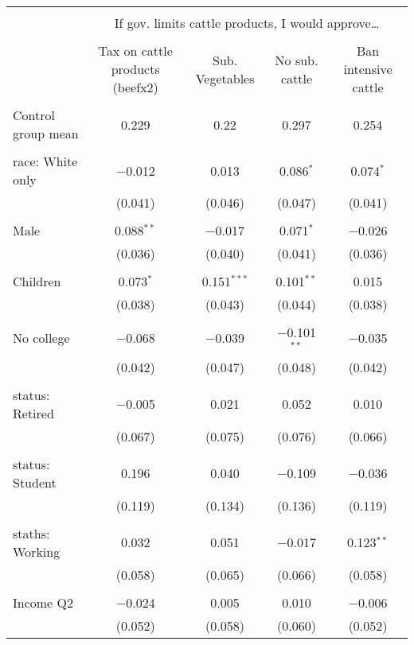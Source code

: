 
\begin{tabular}{@{\extracolsep{5pt}}lcccc} 
\\[-1.8ex]\hline 
\hline \\[-1.8ex] 
 & \multicolumn{4}{c}{If gov. limits cattle products, I would approve…} \\ 
\cline{2-5} 
\\[-1.8ex] & Tax on cattle products (beefx2) & Sub. Vegetables & No sub. cattle & Ban intensive cattle \\ 
\hline \\[-1.8ex] 
 Control group mean & 0.229 & 0.22 & 0.297 & 0.254  \\ \hline \\[-1.8ex] race: White only & $-$0.012 & 0.013 & 0.086$^{*}$ & 0.074$^{*}$ \\ 
  & (0.041) & (0.046) & (0.047) & (0.041) \\ 
  & & & & \\ 
 Male & 0.088$^{**}$ & $-$0.017 & 0.071$^{*}$ & $-$0.026 \\ 
  & (0.036) & (0.040) & (0.041) & (0.036) \\ 
  & & & & \\ 
 Children & 0.073$^{*}$ & 0.151$^{***}$ & 0.101$^{**}$ & 0.015 \\ 
  & (0.038) & (0.043) & (0.044) & (0.038) \\ 
  & & & & \\ 
 No college & $-$0.068 & $-$0.039 & $-$0.101$^{**}$ & $-$0.035 \\ 
  & (0.042) & (0.047) & (0.048) & (0.042) \\ 
  & & & & \\ 
 status: Retired & $-$0.005 & 0.021 & 0.052 & 0.010 \\ 
  & (0.067) & (0.075) & (0.076) & (0.066) \\ 
  & & & & \\ 
 status: Student & 0.196 & 0.040 & $-$0.109 & $-$0.036 \\ 
  & (0.119) & (0.134) & (0.136) & (0.119) \\ 
  & & & & \\ 
 staths: Working & 0.032 & 0.051 & $-$0.017 & 0.123$^{**}$ \\ 
  & (0.058) & (0.065) & (0.066) & (0.058) \\ 
  & & & & \\ 
 Income Q2 & $-$0.024 & 0.005 & 0.010 & $-$0.006 \\ 
  & (0.052) & (0.058) & (0.060) & (0.052) \\ 

\end{tabular}

